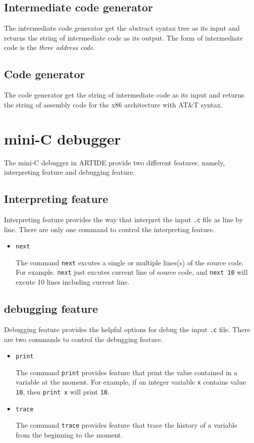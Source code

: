 \documentclass{article}
\newcommand{\code}[1]{\texttt{#1}}
\begin{document}
	\subsection{Intermediate code generator}
	
	The intermediate code generator get the abstract syntax tree as its input and returns the string of intermediate code as its output. The form of intermediate code is the \emph{three address code}.	
	
	\subsection{Code generator}
	
	The code generator get the string of intermediate code as its input and returns the string of assembly code for the x86 architecture with AT\&T syntax.
	
	\section{mini-C debugger}
	
	The mini-C debugger in ARTIDE provide two different features, namely, interpreting feature and debugging feature.
	
	\subsection{Interpreting feature}
	
	Interpreting feature provides the way that interpret the input \code{.c} file as line by line. There are only one command to control the interpreting feature.
	
	\begin{itemize}
		\item \code{next}
		
		The command \code{next} excutes a single or multiple lines(s) of the source code. For example. \code{next} just excutes current line of source code, and \code{next 10} will excute 10 lines including current line.
	\end{itemize}
	
	\subsection{debugging feature}
	
	Debugging feature provides the helpful options for debug the input \code{.c} file. There are two commands to control the debugging feature.
	
	\begin{itemize}
		\item \code{print}
		
		The command \code{print} provides feature that print the value contained in a variable at the moment. For example, if an integer variable \code{x} contains value \code{10}, then \code{print x} will print \code{10}.
		
		\item \code{trace}
		
		The command \code{trace} provides feature that trace the history of a variable from the beginning to the moment.
	\end{itemize}
	
	\nocite{*}
	\printbibliography
\end{document}
